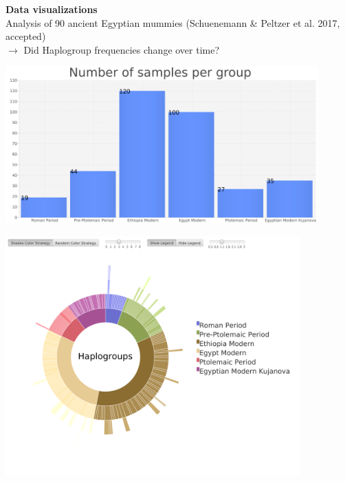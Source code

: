\documentclass[a0paper,portrait]{baposter}
\begin{document}
\begin{poster}
{\textbf{Data visualizations}\\
Analysis of 90 ancient Egyptian mummies \footnotesize{(Schuenemann \& Peltzer et al. 2017, accepted)}\\
$\rightarrow$ Did Haplogroup frequencies change over time?\\
	\begin{minipage}[t]{0.5\textwidth}
		\includegraphics[width=0.9\textwidth, center]{figures/group_sizes.png}
	\end{minipage}
	\begin{minipage}[t]{0.5\textwidth}
		\includegraphics[width=0.85\textwidth, center]{figures/sunburst2.png}
	\end{minipage}

}
\end{poster}
\end{document}
